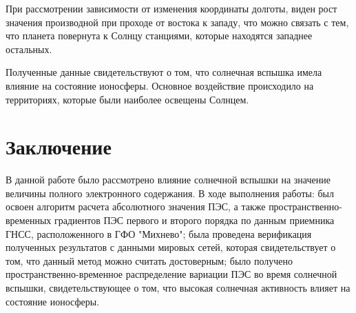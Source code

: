 \documentclass[a4paper]{article}
\begin{document}
При рассмотрении зависимости от изменения координаты долготы, виден рост значения производной при проходе от востока к западу, что можно связать с тем, что планета повернута к Солнцу станциями, которые находятся западнее остальных.

Полученные данные свидетельствуют о том, что солнечная вспышка имела влияние на состояние ионосферы. Основное воздействие происходило на территориях, которые были наиболее освещены Солнцем. 


\newpage
\section{Заключение}
В данной работе было рассмотрено влияние солнечной вспышки на значение величины полного электронного содержания. В ходе выполнения работы: был освоен алгоритм расчета абсолютного значения ПЭС, а также пространственно-временных градиентов ПЭС первого и второго порядка по данным приемника ГНСС, расположенного в ГФО "Михнево"; была проведена верификация полученных результатов с данными мировых сетей, которая свидетельствует о том, что данный метод можно считать достоверным; было получено пространственно-временное распределение вариации ПЭС во время солнечной вспышки, свидетельствующее о том, что высокая солнечная активность влияет на состояние ионосферы.


\newpage
\printbibliography
\end{document}
